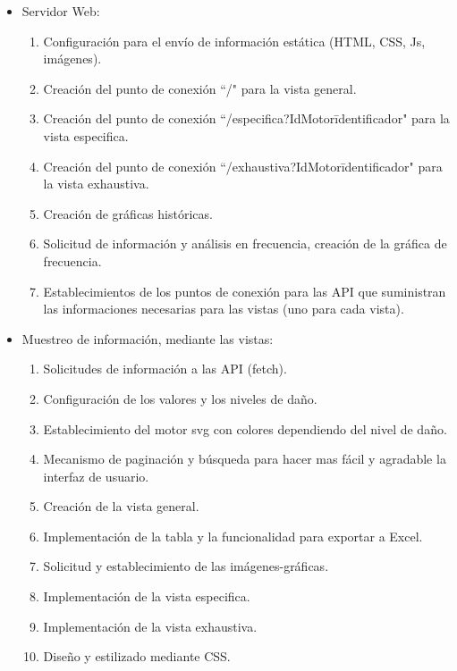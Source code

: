 \begin{itemize}
    \item Servidor Web:
        \begin{enumerate}
            \item Configuración para el envío de información estática
                (HTML, CSS, Js, imágenes).
            \item Creación del punto de conexión ``/" para la vista general.
            \item Creación del punto de conexión ``/especifica?IdMotor\= identificador"
                para la vista especifica.
            \item Creación del punto de conexión ``/exhaustiva?IdMotor\=identificador"
                para la vista exhaustiva.
            \item Creación de gráficas históricas.
            \item Solicitud de información y análisis en frecuencia, creación de
                la gráfica de frecuencia.
            \item Establecimientos de los puntos de conexión para las API que
                suministran las informaciones necesarias para las vistas (uno
                para cada vista).
        \end{enumerate}

    \item Muestreo de información, mediante las vistas:
        \begin{enumerate}
            \item Solicitudes de información a las API (fetch).
            \item Configuración de los valores y los niveles de daño.
            \item Establecimiento del motor svg con colores dependiendo del nivel
                de daño.
            \item Mecanismo de paginación y búsqueda para hacer mas fácil y agradable
                la interfaz de usuario.
            \item Creación de la vista general.
            \item Implementación de la tabla y la funcionalidad para exportar a
                Excel.
            \item Solicitud y establecimiento de las imágenes-gráficas.
            \item Implementación de la vista especifica.
            \item Implementación de la vista exhaustiva.
            \item Diseño y estilizado mediante CSS.
        \end{enumerate}


\end{itemize}
